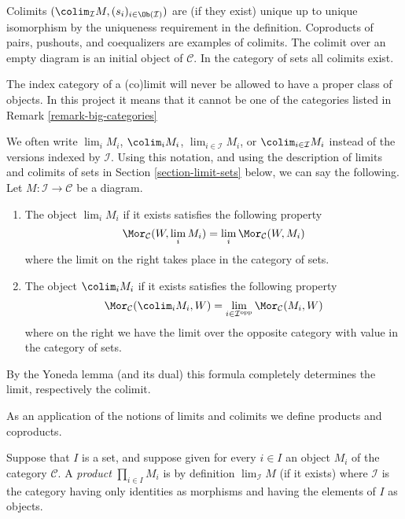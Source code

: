 \noindent
Colimits $(\colim_\mathcal{I} M, (s_i)_{i\in \Ob(\mathcal{I})})$ are
(if they exist) unique up to unique isomorphism by the uniqueness requirement
in the definition. Coproducts of pairs, pushouts, and coequalizers are
examples of colimits. The colimit over an empty diagram is an initial object
of $\mathcal{C}$. In the category of sets all colimits exist.

\begin{remark}
\label{remark-diagram-small}
The index category of a (co)limit will never be allowed to have
a proper class of objects. In this project it means that
it cannot be one of the categories listed in
Remark \ref{remark-big-categories}
\end{remark}

\begin{remark}
\label{remark-limit-colim}
We often write $\lim_i M_i$, $\colim_i M_i$,
$\lim_{i\in \mathcal{I}} M_i$, or $\colim_{i\in \mathcal{I}} M_i$
instead of the versions indexed by $\mathcal{I}$.
Using this notation, and using the description of
limits and colimits of sets in Section \ref{section-limit-sets}
below, we can say the following.
Let $M : \mathcal{I} \to \mathcal{C}$ be a diagram.
\begin{enumerate}
\item The object $\lim_i M_i$ if it exists satisfies the following property
$$
\Mor_\mathcal{C}(W, \lim_i M_i)
=
\lim_i \Mor_\mathcal{C}(W, M_i)
$$
where the limit on the right takes place in the category of sets.
\item The object $\colim_i M_i$ if it
exists satisfies the following property
$$
\Mor_\mathcal{C}(\colim_i M_i, W)
=
\lim_{i\in \mathcal{I}^\text{opp}} \Mor_\mathcal{C}(M_i, W)
$$
where on the right we have the limit over the opposite category
with value in the category of sets.
\end{enumerate}
By the Yoneda lemma (and its dual) this formula completely determines the
limit, respectively the colimit.
\end{remark}

\noindent
As an application of the notions of limits and colimits
we define products and coproducts.

\begin{definition}
\label{definition-product}
Suppose that $I$ is a set, and suppose given for every $i \in I$ an
object $M_i$ of the category $\mathcal{C}$. A {\it product}
$\prod_{i\in I} M_i$ is by definition $\lim_\mathcal{I} M$
(if it exists)
where $\mathcal{I}$ is the category having only identities as
morphisms and having the elements of $I$ as objects.
\end{definition}

